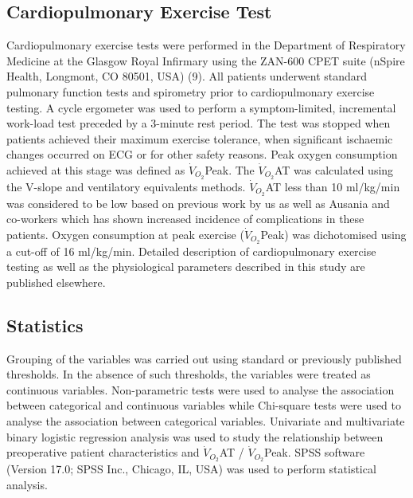 \subsection{Cardiopulmonary Exercise Test}
Cardiopulmonary exercise tests were performed in the Department of Respiratory Medicine at the Glasgow Royal Infirmary using the ZAN-600 CPET suite (nSpire Health, Longmont, CO 80501, USA) (9). All patients underwent standard pulmonary function tests and spirometry prior to cardiopulmonary exercise testing. A cycle ergometer was used to perform a symptom-limited, incremental work-load test preceded by a 3-minute rest period. The test was stopped when patients achieved their maximum exercise tolerance, when significant ischaemic changes occurred on ECG or for other safety reasons. Peak oxygen consumption achieved at this stage was defined as $\dot{V}_{O_2}$Peak. The $\dot{V}_{O_2}$AT was calculated using the V-slope\parencite{beaver_new_1986,sue_metabolic_1988} and ventilatory equivalents\parencite{society_ats/accp_2003} methods. $\dot{V}_{O_2}$AT less than 10 ml/kg/min was considered to be low based on previous work by us\parencite{chandrabalan_pre-operative_2013} as well as Ausania and co-workers\parencite{ausania_effects_2012} which has shown increased incidence of complications in these patients. Oxygen consumption at peak exercise ($\dot{V}_{O_2}$Peak) was dichotomised using a cut-off of 16 ml/kg/min. Detailed description of cardiopulmonary exercise testing as well as the physiological parameters described in this study are published elsewhere.\parencite{balady_clinicians_2010}

\subsection{Statistics}
Grouping of the variables was carried out using standard or previously published thresholds. In the absence of such thresholds, the variables were treated as continuous variables. Non-parametric tests were used to analyse the association between categorical and continuous variables while Chi-square tests were used to analyse the association between categorical variables. Univariate and multivariate binary logistic regression analysis was used to study the relationship between preoperative patient characteristics and $\dot{V}_{O_2}$AT / $\dot{V}_{O_2}$Peak. SPSS software (Version 17.0; SPSS Inc., Chicago, IL, USA) was used to perform statistical analysis.

\clearpage

